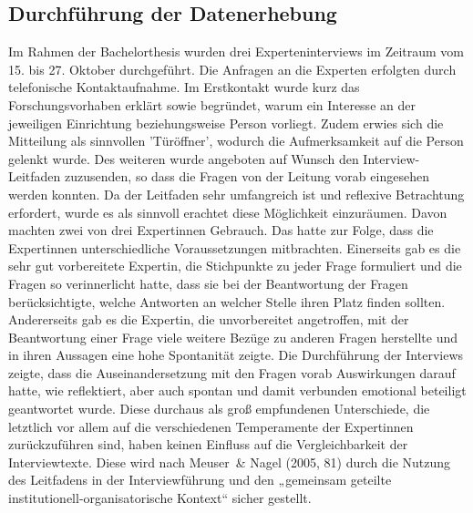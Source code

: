 \subsection{Durchführung der Datenerhebung}
Im Rahmen der Bachelorthesis wurden drei Experteninterviews im Zeitraum vom 15. bis 27. Oktober durchgeführt. 
Die Anfragen an die Experten erfolgten durch telefonische Kontaktaufnahme. Im Erstkontakt wurde kurz das Forschungsvorhaben erklärt sowie begründet, warum ein Interesse an der jeweiligen Einrichtung beziehungsweise Person vorliegt. Zudem erwies sich die Mitteilung als sinnvollen ’Türöffner’, wodurch die Aufmerksamkeit auf die Person gelenkt wurde. 
Des weiteren wurde angeboten auf Wunsch den Interview-Leitfaden zuzusenden, so dass die Fragen von der Leitung vorab eingesehen werden konnten. Da der Leitfaden sehr umfangreich ist und reflexive Betrachtung erfordert, wurde es als sinnvoll erachtet diese Möglichkeit einzuräumen. Davon machten zwei von drei Expertinnen Gebrauch. Das hatte zur Folge, dass die Expertinnen unterschiedliche Voraussetzungen mitbrachten. Einerseits gab es die sehr gut vorbereitete Expertin, die Stichpunkte zu jeder Frage formuliert und die Fragen so verinnerlicht hatte, dass sie bei der Beantwortung der Fragen berücksichtigte, welche Antworten an welcher Stelle ihren Platz finden sollten. Andererseits gab es die Expertin, die unvorbereitet angetroffen, mit der Beantwortung einer Frage viele weitere Bezüge zu anderen Fragen herstellte und in ihren Aussagen eine hohe Spontanität zeigte. Die Durchführung der Interviews zeigte, dass die Auseinandersetzung mit den Fragen vorab Auswirkungen darauf hatte, wie reflektiert, aber auch spontan und damit verbunden emotional beteiligt geantwortet wurde.     
Diese durchaus als groß empfundenen Unterschiede, die letztlich vor allem auf die verschiedenen Temperamente der Expertinnen zurückzuführen sind, haben keinen Einfluss auf die Vergleichbarkeit der Interviewtexte. Diese wird nach Meuser~\& Nagel (2005, 81) durch die Nutzung des Leitfadens in der Interviewführung und den „gemeinsam geteilte institutionell-organisatorische Kontext“ sicher gestellt.

